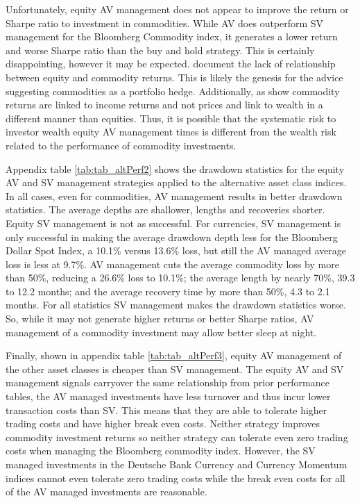 Unfortunately, equity AV management does not appear to improve the return or Sharpe ratio to investment in commodities. While AV does outperform SV management for the Bloomberg Commodity index, it generates a lower return and worse Sharpe ratio than the buy and hold strategy. This is certainly disappointing, however it may be expected. \citet{gorton_facts_2006,buyuksahin_commodities_2008,NBERw21243} document the lack of relationship between equity and commodity returns. This is likely the genesis for the advice suggesting commodities as a portfolio hedge. Additionally, as \citet{erb_conquering_nodate} show commodity returns are linked to income returns and not prices and link to wealth in a different manner than equities. Thus, it is possible that the systematic risk to investor wealth equity AV management times is different from the wealth risk related to the performance of commodity investments.


Appendix table \ref{tab:tab_altPerf2} shows the drawdown statistics for the equity AV and SV management strategies applied to the alternative asset class indices. In all cases, even for commodities, AV management results in better drawdown statistics. The average depths are shallower, lengths and recoveries shorter. Equity SV management is not as successful. For currencies, SV management is only successful in making the average drawdown depth less for the Bloomberg Dollar Spot Index, a 10.1\% versus 13.6\% loss, but still the AV managed average loss is less at 9.7\%. AV management cuts the average commodity loss by more than 50\%, reducing a 26.6\% loss to 10.1\%; the average length by nearly 70\%, 39.3 to 12.2 months; and the average recovery time by more than 50\%, 4.3 to 2.1 months. For all statistics SV management makes the drawdown statistics worse. So, while it may not generate higher returns or better Sharpe ratios, AV management of a commodity investment may allow better sleep at night.


Finally, shown in appendix table \ref{tab:tab_altPerf3}, equity AV management of the other asset classes is cheaper than SV management. The equity AV and SV management signals carryover the same relationship from prior performance tables, the AV managed investments have less turnover and thus incur lower transaction costs than SV. This means that they are able to tolerate higher trading costs and have higher break even costs. Neither strategy improves commodity investment returns so neither strategy can tolerate even zero trading costs when managing the Bloomberg commodity index. However, the SV managed investments in the Deutsche Bank Currency and Currency Momentum indices cannot even tolerate zero trading costs while the break even costs for all of the AV managed investments are reasonable. 

